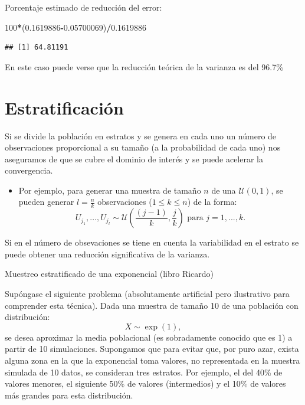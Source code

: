 \documentclass[]{book}
\newenvironment{Shaded}{\begin{snugshade}}{\end{snugshade}}
\newcommand{\DecValTok}[1]{\textcolor[rgb]{0.00,0.00,0.81}{#1}}
\newcommand{\FloatTok}[1]{\textcolor[rgb]{0.00,0.00,0.81}{#1}}
\newcommand{\OperatorTok}[1]{\textcolor[rgb]{0.81,0.36,0.00}{\textbf{#1}}}
\newcommand{\NormalTok}[1]{#1}
\providecommand{\tightlist}{%
  \setlength{\itemsep}{0pt}\setlength{\parskip}{0pt}}
\theoremstyle{definition}
\theoremstyle{definition}
\theoremstyle{definition}
\theoremstyle{remark}
\let\BeginKnitrBlock\begin \let\EndKnitrBlock\end
\begin{document}
Porcentaje estimado de reducción del error:

\begin{Shaded}
\begin{Highlighting}[]
\DecValTok{100}\OperatorTok{*}\NormalTok{(}\FloatTok{0.1619886}\OperatorTok{-}\FloatTok{0.05700069}\NormalTok{)}\OperatorTok{/}\FloatTok{0.1619886}
\end{Highlighting}
\end{Shaded}

\begin{verbatim}
## [1] 64.81191
\end{verbatim}

En este caso puede verse que la reducción teórica de la varianza es del
96.7\%

\section{Estratificación}\label{estratificacion}

Si se divide la población en estratos y se genera en cada uno un número
de observaciones proporcional a su tamaño (a la probabilidad de cada
uno) nos aseguramos de que se cubre el dominio de interés y se puede
acelerar la convergencia.

\begin{itemize}
\tightlist
\item
  Por ejemplo, para generar una muestra de tamaño \(n\) de una
  \(\mathcal{U}\left( 0,1\right)\), se pueden generar \(l=\frac{n}{k}\)
  observaciones (\(1\leq k\leq n\)) de la forma:
  \[U_{j_{1}},\ldots,U_{j_{l}}\sim \mathcal{U}\left(  \frac{(j-1)}{k},\frac{j}{k}\right)  \text{ para }j=1,...,k.\]
\end{itemize}

Si en el número de obsevaciones se tiene en cuenta la variabilidad en el
estrato se puede obtener una reducción significativa de la varianza.

\BeginKnitrBlock{example}
\protect\hypertarget{exm:unnamed-chunk-10}{}{\label{exm:unnamed-chunk-10}
}Muestreo estratificado de una exponencial (libro Ricardo)
\EndKnitrBlock{example}

Supóngase el siguiente problema (absolutamente artificial pero
ilustrativo para comprender esta técnica). Dada una muestra de tamaño 10
de una población con distribución: \[X \sim \exp\left( 1 \right),\] se
desea aproximar la media poblacional (es sobradamente conocido que es 1)
a partir de 10 simulaciones. Supongamos que para evitar que, por puro
azar, exista alguna zona en la que la exponencial toma valores, no
representada en la muestra simulada de 10 datos, se consideran tres
estratos. Por ejemplo, el del 40\% de valores menores, el siguiente 50\%
de valores (intermedios) y el 10\% de valores más grandes para esta
distribución.
\end{document}
